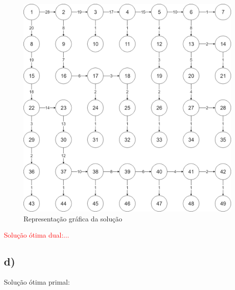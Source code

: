 \documentclass[11pt]{article} %
\begin{document}
	\begin{figure}[!htpb]
		\centering
    		\includegraphics[width=5in]{grafo1c.png}
    		\caption{Representação gráfica da solução}
	\end{figure}


\textcolor{red}{Solução ótima dual:...}

\newpage

\subsection*{d)}
Solução ótima primal:
\end{document}
